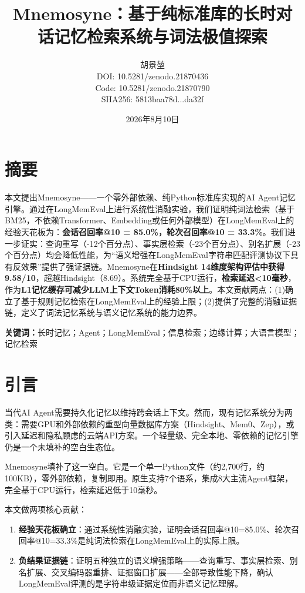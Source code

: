 \documentclass[11pt,a4paper]{ctexart}
\title{\textbf{Mnemosyne：基于纯标准库的长时对话记忆检索系统与词法极值探索}}
\author{胡景堃 \\[4pt] \small DOI: 10.5281/zenodo.21870436 \\ \small Code: 10.5281/zenodo.21870790 \\ \small SHA256: 5813baa78d...da32f}
\date{2026年8月10日}
\begin{document}
\maketitle

\section*{摘要}

本文提出Mnemosyne——一个零外部依赖、纯Python标准库实现的AI Agent记忆引擎。通过在LongMemEval上进行系统性消融实验，我们证明纯词法检索（基于BM25，不依赖Transformer、Embedding或任何外部模型）在LongMemEval上的经验天花板为：\textbf{会话召回率@10 = 85.0\%，轮次召回率@10 = 33.3\%}。我们进一步证实：查询重写（-12个百分点）、事实层检索（-23个百分点）、别名扩展（-23个百分点）均会降低性能，为“语义增强在LongMemEval字符串匹配评测协议下具有反效果”提供了强证据链。Mnemosyne在\textbf{Hindsight 14维度架构评估中获得9.58/10}，超越Hindsight（8.69）。系统完全基于CPU运行，\textbf{检索延迟<10毫秒}，作为\textbf{L1记忆缓存可减少LLM上下文Token消耗80\%以上}。本文贡献两点：(1)确立了基于规则记忆检索在LongMemEval上的经验上限；(2)提供了完整的消融证据链，定义了词法记忆系统与语义记忆系统的能力边界。

\noindent\textbf{关键词：}长时记忆；Agent；LongMemEval；信息检索；边缘计算；大语言模型；记忆检索

\section{引言}

当代AI Agent需要持久化记忆以维持跨会话上下文。然而，现有记忆系统分为两类：需要GPU和外部依赖的重型向量数据库方案（Hindsight、Mem0、Zep），或引入延迟和隐私顾虑的云端API方案。一个轻量级、完全本地、零依赖的记忆引擎仍是一个未填补的空白生态位。

Mnemosyne填补了这一空白。它是一个单一Python文件（约2,700行，约100KB），零外部依赖，复制即用。原生支持7个语系，集成8大主流Agent框架，完全基于CPU运行，检索延迟低于10毫秒。

本文做两项核心贡献：

\begin{enumerate}
    \item \textbf{经验天花板确立}：通过系统性消融实验，证明会话召回率@10=85.0\%、轮次召回率@10=33.3\%是纯词法检索在LongMemEval上的实际上限。
    \item \textbf{负结果证据链}：证明五种独立的语义增强策略——查询重写、事实层检索、别名扩展、交叉编码器重排、证据窗口扩展——全部导致性能下降，确认LongMemEval评测的是字符串级证据定位而非语义记忆理解。
\end{enumerate}
\end{document}
